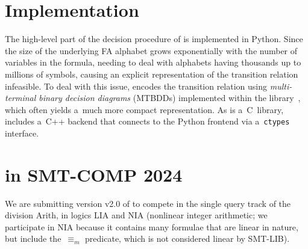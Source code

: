 \documentclass[acmsmall,screen,nonacm=true]{acmart}
\begin{document}

\vspace{-0.0mm}
\section{Implementation}\label{sec:label}
\vspace{-0.0mm}

The high-level part of the decision procedure of \amaya is implemented in Python.
Since the size of the underlying FA alphabet grows exponentially with the number of variables in the formula, needing to deal with alphabets having thousands up to millions of symbols, causing an explicit representation of the transition relation infeasible.
To deal with this issue, \amaya encodes the transition relation using
\emph{multi-terminal binary decision diagrams} (MTBDDs) implemented within the
\sylvan library~\cite{DijkP15}, which often yields a~much more compact representation.
As \sylvan is a~C~library, \amaya includes a~C++ backend that connects to the
Python frontend via a~\texttt{ctypes} interface.



\ol{}



\vspace{-0.0mm}
\section{\amaya in SMT-COMP 2024}\label{sec:label}
\vspace{-0.0mm}

We are submitting version v2.0 of \amaya to compete in the single query track
of the division Arith, in logics LIA and NIA (nonlinear integer arithmetic; we
participate in NIA because it contains many formulae that are linear in nature, but
include the~$\equiv_m$ predicate, which is not considered linear by SMT-LIB).








\end{document}
